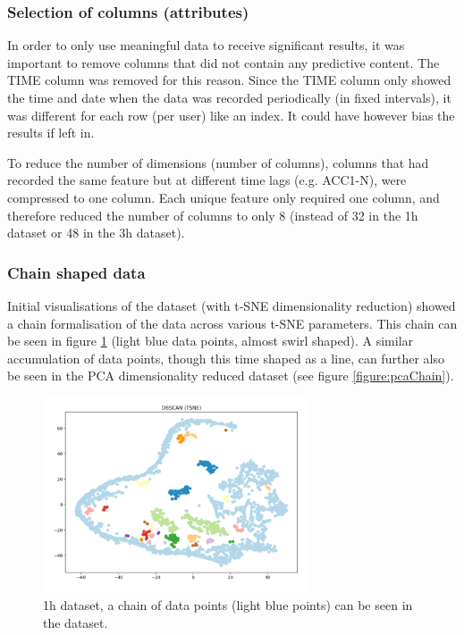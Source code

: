 
\subsubsection{Selection of columns (attributes)}

In order to only use meaningful data to receive significant results, it was important to remove columns that did not contain any predictive content. The TIME column was removed for this reason. Since the TIME column only showed the time and date when the data was recorded periodically (in fixed intervals), it was different for each row (per user) like an index. It could have however bias the results if left in. 

To reduce the number of dimensions (number of columns), columns that had recorded the same feature but at different time lags (e.g. ACC1-N), were compressed to one column. Each unique feature only required one column, and therefore reduced the number of columns to only 8 (instead of 32 in the 1h dataset or 48 in the 3h dataset).


\subsubsection{Chain shaped data}
\label{section:chainShapedData}
Initial visualisations of the dataset (with t-SNE dimensionality reduction) showed a chain formalisation of the data across various t-SNE parameters. This chain can be seen in figure \ref{figure:tsneChain} (light blue data points, almost swirl shaped). A similar accumulation of data points, though this time shaped as a line, can further also be seen in the PCA dimensionality reduced dataset (see figure \ref{figure:pcaChain}). 


\begin{figure}[h]
  \centering
  \includegraphics[width=0.7\textwidth]{./images/tsneChain.png}
  \caption{1h dataset, a chain of data points (light blue points) can be seen in the dataset.}
  \label{figure:tsneChain}
\end{figure}


